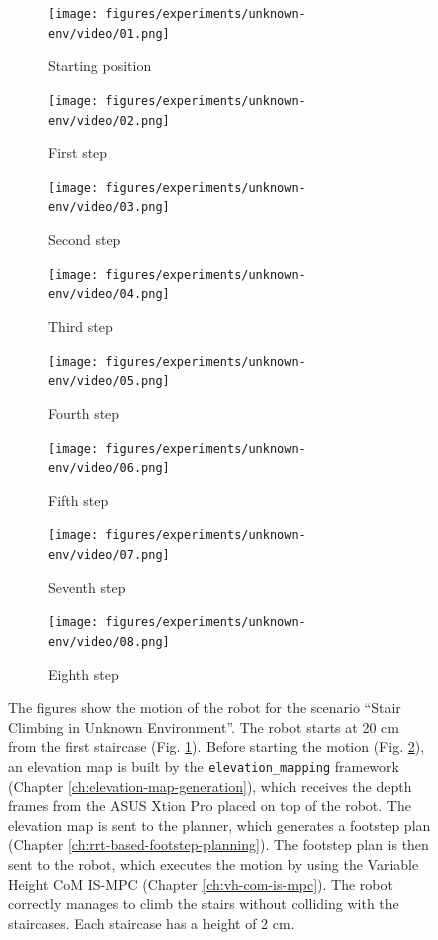 \begin{figure}
  \begin{subfigure}{0.48\textwidth}
    \texttt{[image: figures/experiments/unknown-env/video/01.png]}
    \caption{Starting position}
    \label{fig:exp:unkenv:frame1}
  \end{subfigure}\hspace*{\fill}
  \begin{subfigure}{0.48\textwidth}
    \texttt{[image: figures/experiments/unknown-env/video/02.png]}
    \caption{First step}
    \label{fig:exp:unkenv:frame2}
  \end{subfigure}
  \begin{subfigure}{0.48\textwidth}
    \texttt{[image: figures/experiments/unknown-env/video/03.png]}
    \caption{Second step}
  \end{subfigure}\hspace*{\fill}
  \begin{subfigure}{0.48\textwidth}
    \texttt{[image: figures/experiments/unknown-env/video/04.png]}
    \caption{Third step}
  \end{subfigure}
  \begin{subfigure}{0.48\textwidth}
    \texttt{[image: figures/experiments/unknown-env/video/05.png]}
    \caption{Fourth step}
  \end{subfigure}\hspace*{\fill}
  \begin{subfigure}{0.48\textwidth}
    \texttt{[image: figures/experiments/unknown-env/video/06.png]}
    \caption{Fifth step}
  \end{subfigure}
  \begin{subfigure}{0.48\textwidth}
    \texttt{[image: figures/experiments/unknown-env/video/07.png]}
    \caption{Seventh step}
  \end{subfigure}\hspace*{\fill}
  \begin{subfigure}{0.48\textwidth}
    \texttt{[image: figures/experiments/unknown-env/video/08.png]}
    \caption{Eighth step}
  \end{subfigure} \caption{The figures show the motion of the robot
      for the scenario ``Stair Climbing in Unknown Environment''.
      The robot starts at 20 cm 
      from the first staircase (Fig. \ref{fig:exp:unkenv:frame1}). Before 
      starting the motion (Fig. \ref{fig:exp:unkenv:frame2}), an
      elevation map is built by the \texttt{elevation\_mapping} framework
      (Chapter \ref{ch:elevation-map-generation}),
      which receives the depth frames from the ASUS Xtion Pro placed 
      on top of the robot. The elevation map is sent to the planner, which 
      generates a footstep plan (Chapter \ref{ch:rrt-based-footstep-planning}).
      The footstep plan is then sent to the 
      robot, which executes the motion by using the Variable Height CoM
      IS-MPC (Chapter \ref{ch:vh-com-is-mpc}). The robot correctly manages to 
      climb the stairs without colliding with the staircases. Each staircase 
      has a height of 2 cm.}
  \label{fig:experiments:unkenv:videoframes}
\end{figure}

